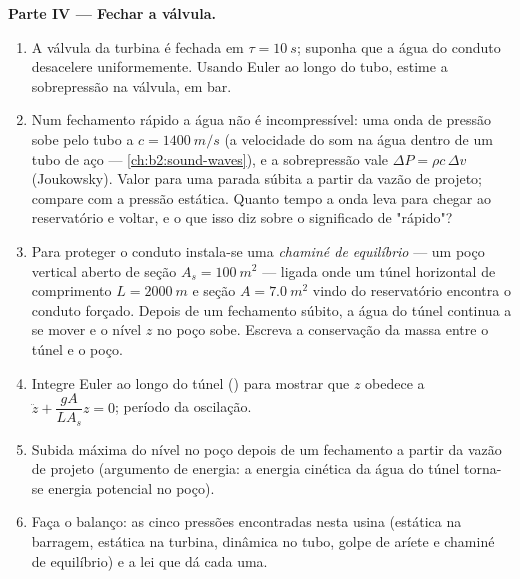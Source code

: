 \begin{problem}
\medskip
\noindent\textbf{Parte IV --- Fechar a válvula.}
\begin{enumerate}[resume]
  \item A válvula da turbina é fechada em $\tau = \qty{10}{s}$; suponha que a
        água do conduto desacelere uniformemente. Usando Euler ao longo
        do tubo, estime a sobrepressão na válvula, em bar.
  \item Num fechamento rápido a água não é incompressível: uma onda de
        pressão sobe pelo tubo a $c = \qty{1400}{m/s}$ (a velocidade do
        som na água dentro de um tubo de aço --- \cref{ch:b2:sound-waves}),
        e a sobrepressão vale $\Delta P = \rho c\,\Delta v$ (Joukowsky).
        Valor para uma parada súbita a partir da vazão de projeto; compare com a
        pressão estática. Quanto tempo a onda leva para chegar ao
        reservatório e voltar, e o que isso diz sobre o significado
        de "rápido"?
  \item Para proteger o conduto instala-se uma \emph{chaminé de equilíbrio} --- um
        poço vertical aberto de seção $A_s = \qty{100}{m^2}$ --- ligada onde um
        túnel horizontal de comprimento $L = \qty{2000}{m}$ e seção $A =
        \qty{7.0}{m^2}$ vindo do reservatório encontra o conduto forçado. Depois de um
        fechamento súbito, a água do túnel continua a se mover e o
        nível $z$ no poço sobe. Escreva a conservação da massa entre
        o túnel e o poço.
  \item Integre Euler ao longo do túnel () para mostrar que
        $z$ obedece a $\ddot z + \dfrac{gA}{LA_s}z = 0$; período da
        oscilação.
  \item Subida máxima do nível no poço depois de um fechamento a partir da
        vazão de projeto (argumento de energia: a energia cinética da água do
        túnel torna-se energia potencial no poço).
  \item Faça o balanço: as cinco pressões encontradas nesta usina (estática na
        barragem, estática na turbina, dinâmica no tubo, golpe de aríete
        e chaminé de equilíbrio) e a lei que dá cada uma.
\end{enumerate}
\end{problem}
